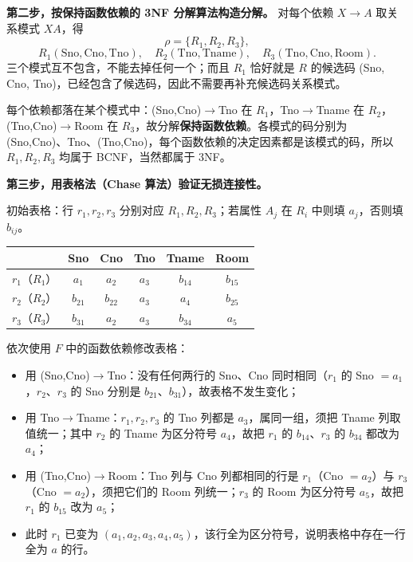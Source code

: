 \documentclass[a4paper,11pt]{article}
\begin{document}
\textbf{第二步，按保持函数依赖的 3NF 分解算法构造分解。} 对每个依赖 $X\to A$ 取关系模式 $XA$，得
\[
\rho=\{R_1,R_2,R_3\},
\]
\[
R_1(\text{Sno},\text{Cno},\text{Tno}),\quad
R_2(\text{Tno},\text{Tname}),\quad
R_3(\text{Tno},\text{Cno},\text{Room}).
\]
三个模式互不包含，不能去掉任何一个；而且 $R_1$ 恰好就是 $R$ 的候选码 (Sno, Cno, Tno)，已经包含了候选码，因此不需要再补充候选码关系模式。

每个依赖都落在某个模式中：(Sno,Cno)$\to$Tno 在 $R_1$，Tno$\to$Tname 在 $R_2$，(Tno,Cno)$\to$Room 在 $R_3$，故分解\textbf{保持函数依赖}。各模式的码分别为 (Sno,Cno)、Tno、(Tno,Cno)，每个函数依赖的决定因素都是该模式的码，所以 $R_1,R_2,R_3$ 均属于 BCNF，当然都属于 3NF。

\textbf{第三步，用表格法（Chase 算法）验证无损连接性。}

初始表格：行 $r_1,r_2,r_3$ 分别对应 $R_1,R_2,R_3$；若属性 $A_j$ 在 $R_i$ 中则填 $a_j$，否则填 $b_{ij}$。

\begin{center}
\begin{tabular}{lccccc}
\toprule
 & Sno & Cno & Tno & Tname & Room \\
\midrule
$r_1$（$R_1$） & $a_1$ & $a_2$ & $a_3$ & $b_{14}$ & $b_{15}$ \\
$r_2$（$R_2$） & $b_{21}$ & $b_{22}$ & $a_3$ & $a_4$ & $b_{25}$ \\
$r_3$（$R_3$） & $b_{31}$ & $a_2$ & $a_3$ & $b_{34}$ & $a_5$ \\
\bottomrule
\end{tabular}
\end{center}

依次使用 $F$ 中的函数依赖修改表格：
\begin{itemize}[leftmargin=1.6em, itemsep=1pt]
  \item 用 (Sno,Cno)$\to$Tno：没有任何两行的 Sno、Cno 同时相同（$r_1$ 的 Sno $=a_1$，$r_2$、$r_3$ 的 Sno 分别是 $b_{21}$、$b_{31}$），故表格不发生变化；
  \item 用 Tno$\to$Tname：$r_1,r_2,r_3$ 的 Tno 列都是 $a_3$，属同一组，须把 Tname 列取值统一；其中 $r_2$ 的 Tname 为区分符号 $a_4$，故把 $r_1$ 的 $b_{14}$、$r_3$ 的 $b_{34}$ 都改为 $a_4$；
  \item 用 (Tno,Cno)$\to$Room：Tno 列与 Cno 列都相同的行是 $r_1$（Cno $=a_2$）与 $r_3$（Cno $=a_2$），须把它们的 Room 列统一；$r_3$ 的 Room 为区分符号 $a_5$，故把 $r_1$ 的 $b_{15}$ 改为 $a_5$；
  \item 此时 $r_1$ 已变为 $(a_1,a_2,a_3,a_4,a_5)$，该行全为区分符号，说明表格中存在一行全为 $a$ 的行。
\end{itemize}
\end{document}
